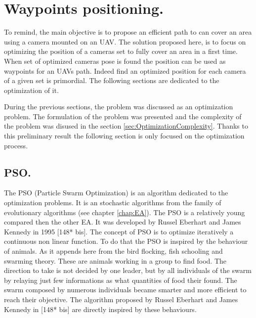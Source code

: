 \chapter{Waypoints positioning.} 
\minitoc
To remind, the main objective is to propose an efficient path to can cover an area using a camera mounted on an UAV. The solution proposed here, is to focus on optimizing the position of a cameras set to fully cover an area in a first time. When set of optimized cameras pose is found the position can be used as waypoints for an UAVs path. Indeed find an optimized position for each camera of a given set is primordial. The following sections are dedicated to the optimization of it. 





During the previous sections, the problem was discussed as an optimization problem. The formulation of the problem was presented  and  the complexity of the problem was disused in the section \ref{sec:OptimizationComplexity}. Thanks to this preliminary result the following section is only focused on the optimization process. 



\section{PSO.}

The PSO (Particle Swarm Optimization) is an algorithm dedicated to the optimization problems. It is an stochastic algorithms from the family of evolutionary algorithms (see  chapter \ref{chap:EA}). 
The PSO is a relatively young compared then the other EA. It was developed by Russel Eberhart and James Kennedy in 1995 [148* bis]. The concept of PSO is to optimize iteratively a continuous non linear function. To do that the PSO is inspired by the behaviour of animals. As it appends here from the bird flocking, fish schooling and swarming theory. These are animals working in a group to find food. 
The direction to take is not decided by one leader, but by all individuals of the swarm by relaying just few informations as what quantities of food their found. 
The swarm composed by numerous individuals became smarter and more efficient to reach their objective. 
The algorithm proposed by Russel Eberhart and James Kennedy in [148* bis] \cite{148*eberhart1995} are directly inspired by these behaviours.

